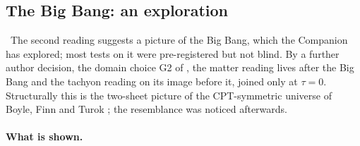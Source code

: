 \subsection{The Big Bang: an exploration}
\label{sec:act-bang}

\Exploration\ The second reading suggests a picture of the Big Bang, which the Companion has explored; most tests on it
were pre-registered but not blind. By a further author decision, the domain choice G2 of , the matter reading
lives after the Big Bang and the tachyon reading on its image before it, joined only at $\tau=0$. Structurally this is the
two-sheet picture of the CPT-symmetric universe of Boyle, Finn and Turok \cite{D:BFT}; the resemblance was noticed
afterwards.

\paragraph{What is shown.}
